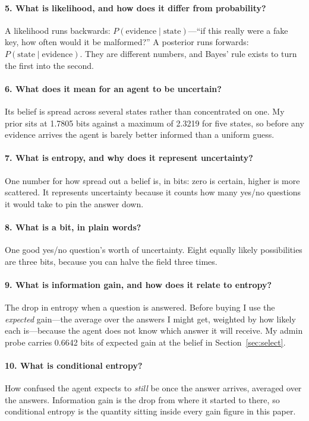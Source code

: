 \documentclass{article}
\begin{document}
\paragraph{5. What is likelihood, and how does it differ from probability?}
A likelihood runs backwards: $P(\text{evidence} \mid \text{state})$---``if this
really were a fake key, how often would it be malformed?'' A posterior runs
forwards: $P(\text{state} \mid \text{evidence})$. They are different numbers, and
Bayes' rule exists to turn the first into the second.

\paragraph{6. What does it mean for an agent to be uncertain?}
Its belief is spread across several states rather than concentrated on one. My
prior sits at 1.7805 bits against a maximum of 2.3219 for five states, so before
any evidence arrives the agent is barely better informed than a uniform guess.

\paragraph{7. What is entropy, and why does it represent uncertainty?}
One number for how spread out a belief is, in bits: zero is certain, higher is
more scattered. It represents uncertainty because it counts how many yes/no
questions it would take to pin the answer down.

\paragraph{8. What is a bit, in plain words?}
One good yes/no question's worth of uncertainty. Eight equally likely
possibilities are three bits, because you can halve the field three times.

\paragraph{9. What is information gain, and how does it relate to entropy?}
The drop in entropy when a question is answered. Before buying I use the
\emph{expected} gain---the average over the answers I might get, weighted by how
likely each is---because the agent does not know which answer it will receive. My
admin probe carries 0.6642 bits of expected gain at the belief in
Section~\ref{sec:select}.

\paragraph{10. What is conditional entropy?}
How confused the agent expects to \emph{still} be once the answer arrives,
averaged over the answers. Information gain is the drop from where it started to
there, so conditional entropy is the quantity sitting inside every gain figure in
this paper.
\end{document}
